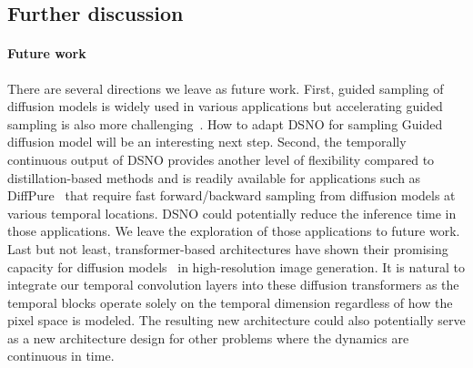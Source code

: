 

\subsection{Further discussion}
\paragraph{Future work}
There are several directions we leave as future work. First, guided sampling of diffusion models is widely used in various applications but accelerating guided sampling is also more challenging~\cite{meng2022distillation}. How to adapt DSNO for sampling Guided diffusion model will be an interesting next step. 
Second, the temporally continuous output of DSNO provides another level of flexibility compared to distillation-based methods and is readily available for applications such as DiffPure~\cite{nie2022DiffPure} that require fast forward/backward sampling from diffusion models at various temporal locations. DSNO could potentially reduce the inference time in those applications.
We leave the exploration of those applications to future work. Last but not least, transformer-based architectures have shown their promising capacity for diffusion models~\cite{peebles2022scalable, bao2023all} in high-resolution image generation. It is natural to integrate our temporal convolution layers into these diffusion transformers as the temporal blocks operate solely on the temporal dimension regardless of how the pixel space is modeled. The resulting new architecture could also potentially serve as a new architecture design for other problems where the dynamics are continuous in time. 

